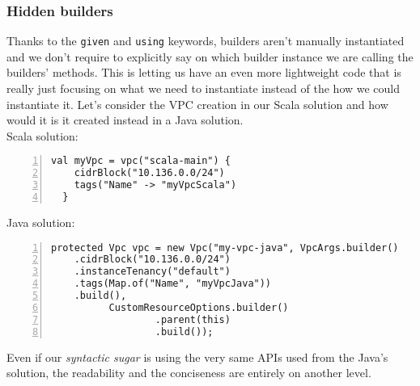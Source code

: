 \subsubsection{Hidden builders}
Thanks to the \texttt{given} and \texttt{using} keywords, builders aren't manually instantiated and we don't require to explicitly say on which builder instance we are calling the builders' methods.
This is letting us have an even more lightweight code that is really just focusing on what we need to instantiate instead of the how we could instantiate it.
Let's consider the VPC creation in our Scala solution and how would it is it created instead in a Java solution.\\
Scala solution:\\
\begin{minipage}{\linewidth}
\begin{lstlisting}[numbers=left, numberstyle=\tiny, numbersep=-5pt, stepnumber=1]
  val myVpc = vpc("scala-main") {
    cidrBlock("10.136.0.0/24")
    tags("Name" -> "myVpcScala")
  }
\end{lstlisting}
\end{minipage}
Java solution:\\
\begin{minipage}{\linewidth}
\begin{lstlisting}[numbers=left, numberstyle=\tiny, numbersep=-5pt, stepnumber=1]
  protected Vpc vpc = new Vpc("my-vpc-java", VpcArgs.builder()
    .cidrBlock("10.136.0.0/24")
    .instanceTenancy("default")
    .tags(Map.of("Name", "myVpcJava"))
    .build(),
          CustomResourceOptions.builder()
                  .parent(this)
                  .build());
\end{lstlisting}
\end{minipage}
Even if our \textit{syntactic sugar} is using the very same APIs used from the Java's solution, the readability and the conciseness are entirely on another level.

